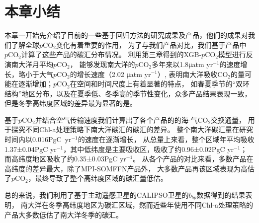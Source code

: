 \section{本章小结}

本章一开始先介绍了目前的一些基于回归方法的研究成果及产品，他们的成果对我们了解全球$p\mathrm{CO_2}$变化有着重要的作用，
为了与我们产品对比，我们基于产品中$p\mathrm{CO_2}$计算了这些产品的碳汇分布情况。
利用第三章得到的XGB-$p\mathrm{CO_2}$模型进行反演南大洋月平均$p\mathrm{CO_2}$，
能够发现南大洋的$p\mathrm{CO_2}$多年来以1.8μatm yr$^{-1}$的速度增长，略小于大气$p\mathrm{CO_2}$的增长速度（2.02 μatm yr$^{-1}$）,
表明南大洋吸收$\mathrm{CO_2}$的量可能在逐渐增加；$p\mathrm{CO_2}$在空间和时间尺度上有着显著的特点，
如春夏季节的“双环结构”地区分布，以及在夏季低、冬季高的季节性变化，众多产品结果表现一致，
但是冬季高纬度区域的差异最为显著的是。

基于$p\mathrm{CO_2}$并结合空气传输速度我们计算出了各个产品的的海-气$\mathrm{CO_2}$交换通量，
用于探究不同Chl-a处理策略下南大洋碳汇的碳汇的差异。
整个南大洋碳汇量在研究时间内以0.016PgC\ yr$^{-1}$的速度在逐渐增长，
从总量上来看，整个区域年平均吸收1.37±0.04PgC yr$^{-1}$，其中低纬度是主要吸收区，吸收了约0.96±0.02PgC yr$^{-1}$；
而高纬度地区吸收了约0.35±0.03PgC yr$^{-1}$。
从各个产品的对比来看，多数产品在高纬度的差异最大，除了MPI-SOMFFN产品外，
大多数产品再该区域表现为高估了$p\mathrm{CO_2}$，最终导致了整个高纬度区域的碳汇量低估。

总的来说，我们利用了基于主动遥感卫星的CALIPSO卫星的$b_{bp}$数据得到的结果表明，
南大洋在冬季高纬度地区为碳汇区域，然而近些年使用不同Chl-a处理策略的产品大多数低估了南大洋冬季的碳汇。










